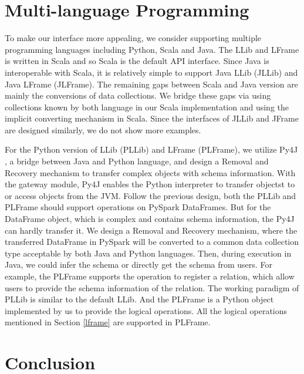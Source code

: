 




\section{Multi-language Programming}
\label{multi}
To make our interface more appealing, we consider supporting multiple programming languages including Python, Scala and Java. The LLib and LFrame is written in Scala and so Scala is the default API interface. Since Java is interoperable with Scala, it is relatively simple to support Java LLib (JLLib) and Java LFrame (JLFrame). The remaining gaps between Scala and Java version are mainly the conversions of data collections. We bridge these gaps via using collections known by both language in our Scala implementation and using the implicit converting mechanism in Scala. Since the interfaces of JLLib and JFrame are designed similarly, we do not show more examples.

For the Python version of LLib (PLLib) and LFrame (PLFrame), we utilize Py4J \citep{py4j}, a bridge between Java and Python language, and design a Removal and Recovery mechanism to transfer complex objects with schema information. With the gateway module, Py4J enables the Python interpreter to transfer objectst to or  access objects from the JVM. Follow the previous design, both the PLLib and PLFrame should support operations on PySpark DataFrames. But for the DataFrame object, which is complex and contains schema information, the Py4J can hardly transfer it. We design a Removal and Recovery mechanism, where the transferred DataFrame in PySpark will be converted to a common data collection type acceptable by both Java and Python languages. Then, during execution in Java, we could infer the schema or directly get the schema from users. For example, the PLFrame supports the operation to register a relation, which allow users to provide the schema information of the relation. The working paradigm of PLLib is similar to the default LLib. And the PLFrame is a Python object implemented by us to provide the logical operations. All the logical operations mentioned in Section \ref{lframe} are supported in PLFrame. 

\section{Conclusion}
\label{llib:conclusion}

